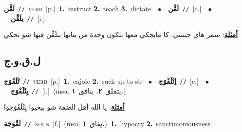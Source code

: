 \documentclass[10pt,a4paper,twoside]{article} %
\begin{document}
\begin{multicols}{2}
{\setlength\topsep{0pt}\textbf{\foreignlanguage{arabic}{لَقَّن}}\ {\color{gray}\texttt{//}\color{black}}\ \textsc{verb}\ [p.]\ \textbf{1.}~instruct  \textbf{2.}~teach  \textbf{3.}~dictate\ \ $\bullet$\ \ \setlength\topsep{0pt}\textbf{\foreignlanguage{arabic}{لَقِّن}}\ {\color{gray}\texttt{//}\color{black}}\ [c.]\ \ $\bullet$\ \ \setlength\topsep{0pt}\textbf{\foreignlanguage{arabic}{يلَقِّن}}\ {\color{gray}\texttt{//}\color{black}}\ [i.]\  \begin{flushright}\color{gray}\foreignlanguage{arabic}{\textbf{\underline{\foreignlanguage{arabic}{أمثلة}}}: سمر هاي جننتني. كا مابجكي معها بتكون وحدة من بناتها بتلَقِّن فيها شو تحكي}\end{flushright}\color{black}} \vspace{2mm}

\vspace{-3mm}
\subsection*{\color{blue}\foreignlanguage{arabic}{ل.ق.و.ج}\color{blue}{}} 

{\setlength\topsep{0pt}\textbf{\foreignlanguage{arabic}{تْلَقْوَج}}\ {\color{gray}\texttt{//}\color{black}}\ \textsc{verb}\ [p.]\ \textbf{1.}~cajole  \textbf{2.}~suck up to sb\ \ $\bullet$\ \ \setlength\topsep{0pt}\textbf{\foreignlanguage{arabic}{اِتْلَقْوَج}}\ {\color{gray}\texttt{//}\color{black}}\ [c.]\ \ $\bullet$\ \ \setlength\topsep{0pt}\textbf{\foreignlanguage{arabic}{يِتْلَقْوَج}}\ {\color{gray}\texttt{//}\color{black}}\ [i.]\ \color{gray}(msa. \foreignlanguage{arabic}{يتملق}~\foreignlanguage{arabic}{\textbf{٢.}}  \foreignlanguage{arabic}{ينافق}~\foreignlanguage{arabic}{\textbf{١.}})\color{black}\  \begin{flushright}\color{gray}\foreignlanguage{arabic}{\textbf{\underline{\foreignlanguage{arabic}{أمثلة}}}: يا الله أهل الضفة شو بيحبوا يِتْلَقْوَجوا}\end{flushright}\color{black}} \vspace{2mm}

{\setlength\topsep{0pt}\textbf{\foreignlanguage{arabic}{لَقْوَجَة}}\ {\color{gray}\texttt{//}\color{black}}\ \textsc{noun}\ [f.]\ \color{gray}(msa. \foreignlanguage{arabic}{نِفاق}~\foreignlanguage{arabic}{\textbf{١.}})\color{black}\ \textbf{1.}~hypocry  \textbf{2.}~sanctimoniousness\ } \vspace{2mm}


\end{multicols}
\end{document}
